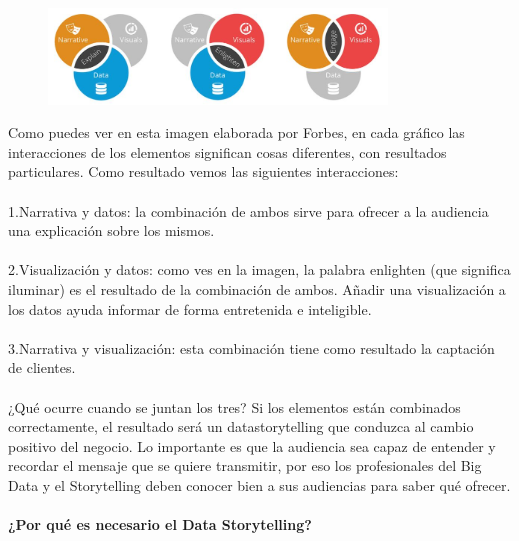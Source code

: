 \documentclass[a4paper,12pt,twocolumn]{article}
\begin{document}
\begin{figure}[h!]
\centering
\includegraphics[width=9cm]{./Imagenes/imagen1}
\end{figure}
\item {Como puedes ver en esta imagen elaborada por Forbes, en cada gráfico las interacciones de los elementos significan cosas diferentes, con resultados particulares. Como resultado vemos las siguientes interacciones:
\\\\1.Narrativa y datos: la combinación de ambos sirve para ofrecer a la audiencia una explicación sobre los mismos.
\\\\2.Visualización y datos: como ves en la imagen, la palabra enlighten (que significa iluminar) es el resultado de la combinación de ambos. Añadir una visualización a los datos ayuda informar de forma entretenida e inteligible.
\\\\3.Narrativa y visualización: esta combinación tiene como resultado la captación de clientes.
\\\\¿Qué ocurre cuando se juntan los tres? Si los elementos están combinados correctamente, el resultado será un datastorytelling que conduzca al cambio positivo del negocio. Lo importante es que la audiencia sea capaz de entender y recordar el mensaje que se quiere transmitir, por eso los profesionales del Big Data y el Storytelling deben conocer bien a sus audiencias para saber qué ofrecer.}
\\\\
\textbf {¿Por qué es necesario el Data Storytelling?}
\end{document}
